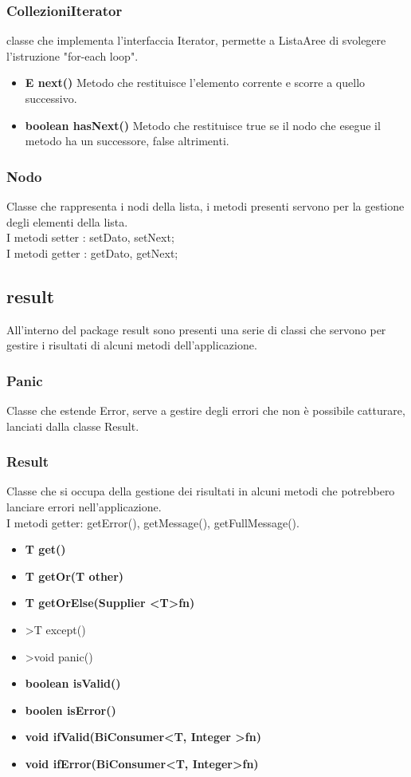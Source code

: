 \documentclass[a4paper, 12pt]{report}
\begin{document}
				\subsubsection{CollezioniIterator} classe che implementa l'interfaccia Iterator, permette a ListaAree di svolegere l'istruzione "for-each loop".
				\begin{itemize}
					\item\textbf{E next()} Metodo che restituisce l'elemento corrente e scorre a quello successivo.
					\item\textbf{boolean hasNext()} Metodo che restituisce true se il nodo che esegue il metodo ha un successore, false altrimenti.
				\end{itemize}


				\subsubsection{Nodo}
				Classe che rappresenta i nodi della lista, i metodi presenti servono per la gestione degli elementi della lista.\\
				I metodi setter : setDato, setNext;\\
				I metodi getter : getDato, getNext;
			
			\subsection{result}
				All'interno del package result sono presenti una serie di classi che servono per gestire i risultati di alcuni metodi dell'applicazione.
				\subsubsection{Panic}
				Classe che estende Error, serve a gestire degli errori che non è possibile catturare, lanciati dalla classe Result.
				
				
				\subsubsection{Result}
				Classe che si occupa della gestione dei risultati in alcuni metodi che potrebbero lanciare errori nell'applicazione.\\
				I metodi getter: getError(), getMessage(), getFullMessage().
				\begin{itemize}
				\item \textbf{T get()}
				\item \textbf{T getOr(T other)}
				\item \textbf{T getOrElse(Supplier \textless T\textgreater fn)}
				\item  \textgreater{T except()}
				\item \textgreater {void panic()}
				\item\textbf{boolean isValid()}
				\item\textbf{boolen isError()}
				\item\textbf{void ifValid(BiConsumer\textless T, Integer \textgreater fn)}
				\item\textbf{void ifError(BiConsumer\textless T, Integer\textgreater fn)}
				\end{itemize}
				
\end{document}
